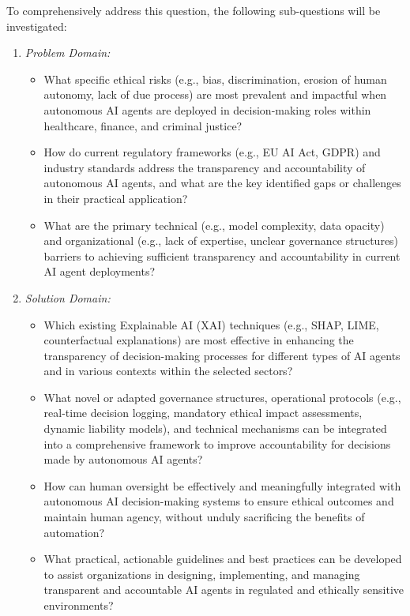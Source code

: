 \documentclass[english]{hogent-article}
\begin{document}
To comprehensively address this question, the following sub-questions will be investigated:
\begin{enumerate}
    \item \textit{Problem Domain:}
    \begin{itemize}
        \item What specific ethical risks (e.g., bias, discrimination, erosion of human autonomy, lack of due process) are most prevalent and impactful when autonomous AI agents are deployed in decision-making roles within healthcare, finance, and criminal justice?
        \item How do current regulatory frameworks (e.g., EU AI Act, GDPR) and industry standards address the transparency and accountability of autonomous AI agents, and what are the key identified gaps or challenges in their practical application?
        \item What are the primary technical (e.g., model complexity, data opacity) and organizational (e.g., lack of expertise, unclear governance structures) barriers to achieving sufficient transparency and accountability in current AI agent deployments?
    \end{itemize}
    \item \textit{Solution Domain:}
    \begin{itemize}
        \item Which existing Explainable AI (XAI) techniques (e.g., SHAP, LIME, counterfactual explanations) are most effective in enhancing the transparency of decision-making processes for different types of AI agents and in various contexts within the selected sectors?
        \item What novel or adapted governance structures, operational protocols (e.g., real-time decision logging, mandatory ethical impact assessments, dynamic liability models), and technical mechanisms can be integrated into a comprehensive framework to improve accountability for decisions made by autonomous AI agents?
        \item How can human oversight be effectively and meaningfully integrated with autonomous AI decision-making systems to ensure ethical outcomes and maintain human agency, without unduly sacrificing the benefits of automation?
        \item What practical, actionable guidelines and best practices can be developed to assist organizations in designing, implementing, and managing transparent and accountable AI agents in regulated and ethically sensitive environments?
    \end{itemize}
\end{enumerate}
\end{document}
